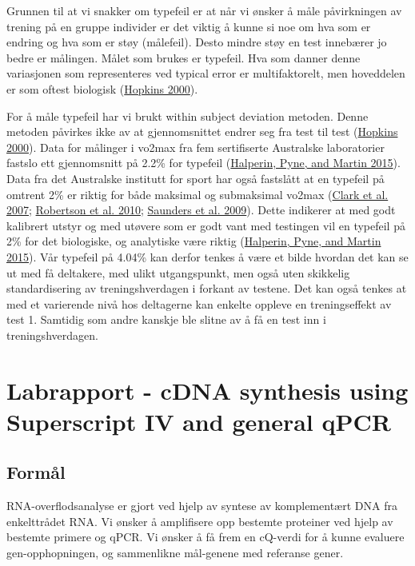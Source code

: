 \documentclass[
]{book}
\begin{document}
Grunnen til at vi snakker om typefeil er at når vi ønsker å måle
påvirkningen av trening på en gruppe individer er det viktig å kunne si
noe om hva som er endring og hva som er støy (målefeil). Desto mindre
støy en test innebærer jo bedre er målingen. Målet som brukes er
typefeil. Hva som danner denne variasjonen som representeres ved typical
error er multifaktorelt, men hoveddelen er som oftest biologisk
(\protect\hyperlink{ref-hopkins2000}{Hopkins 2000}).

For å måle typefeil har vi brukt within subject deviation metoden. Denne
metoden påvirkes ikke av at gjennomsnittet endrer seg fra test til test
(\protect\hyperlink{ref-hopkins2000}{Hopkins 2000}). Data for målinger i
vo2max fra fem sertifiserte Australske laboratorier fastslo ett
gjennomsnitt på 2.2\% for typefeil
(\protect\hyperlink{ref-halperin2015}{Halperin, Pyne, and Martin 2015}).
Data fra det Australske institutt for sport har også fastslått at en
typefeil på omtrent 2\% er riktig for både maksimal og submaksimal
vo2max (\protect\hyperlink{ref-clark2007}{Clark et al. 2007};
\protect\hyperlink{ref-robertson2010}{Robertson et al. 2010};
\protect\hyperlink{ref-saunders2009}{Saunders et al. 2009}). Dette
indikerer at med godt kalibrert utstyr og med utøvere som er godt vant
med testingen vil en typefeil på 2\% for det biologiske, og analytiske
være riktig (\protect\hyperlink{ref-halperin2015}{Halperin, Pyne, and
Martin 2015}). Vår typefeil på 4.04\% kan derfor tenkes å være et bilde
hvordan det kan se ut med få deltakere, med ulikt utgangspunkt, men også
uten skikkelig standardisering av treningshverdagen i forkant av
testene. Det kan også tenkes at med et varierende nivå hos deltagerne
kan enkelte oppleve en treningseffekt av test 1. Samtidig som andre
kanskje ble slitne av å få en test inn i treningshverdagen.

\hypertarget{labrapport---cdna-synthesis-using-superscript-iv-and-general-qpcr}{%
\chapter{Labrapport - cDNA synthesis using Superscript IV and general
qPCR}\label{labrapport---cdna-synthesis-using-superscript-iv-and-general-qpcr}}

\hypertarget{formuxe5l}{%
\section{Formål}\label{formuxe5l}}

RNA-overflodsanalyse er gjort ved hjelp av syntese av komplementært DNA
fra enkelttrådet RNA. Vi ønsker å amplifisere opp bestemte proteiner ved
hjelp av bestemte primere og qPCR. Vi ønsker å få frem en cQ-verdi for å
kunne evaluere gen-opphopningen, og sammenlikne mål-genene med referanse
gener.
\end{document}
